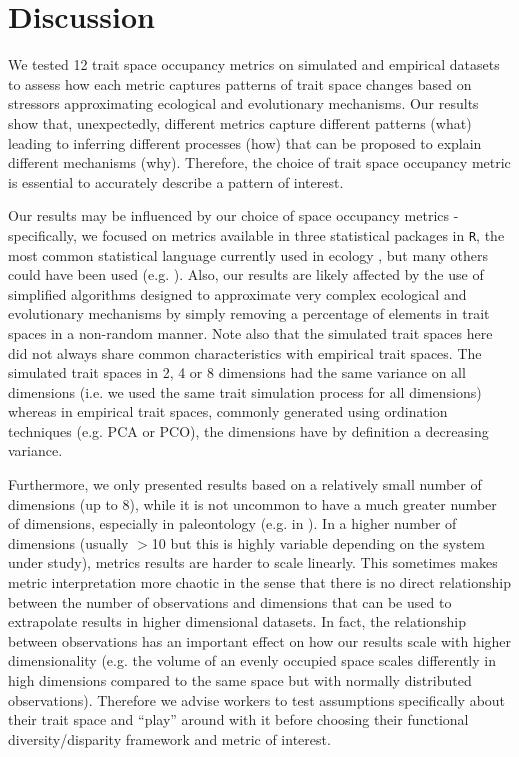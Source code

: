 \documentclass[12pt,letterpaper]{article}
\begin{document}
\section{Discussion}

We tested 12 trait space occupancy metrics on simulated and empirical datasets to assess how each metric captures patterns of trait space changes based on stressors approximating ecological and evolutionary mechanisms.
Our results show that, unexpectedly, different metrics capture different patterns (what) leading to inferring different processes (how) that can be proposed to explain different mechanisms (why).
Therefore, the choice of trait space occupancy metric is essential to accurately describe a pattern of interest.

Our results may be influenced by our choice of space occupancy metrics - specifically, we focused on metrics available in three statistical packages in \texttt{R}, the most common statistical language currently used in ecology \citep{lai2019evaluating}, but many others could have been used (e.g. \citealt{guillerme2020shifting}).
Also, our results are likely affected by the use of simplified algorithms designed to approximate very complex ecological and evolutionary mechanisms by simply removing a percentage of elements in trait spaces in a non-random manner.
Note also that the simulated trait spaces here did not always share common characteristics with empirical trait spaces.
The simulated trait spaces in 2, 4 or 8 dimensions had the same variance on all dimensions (i.e. we used the same trait simulation process for all dimensions) whereas in empirical trait spaces, commonly generated using ordination techniques (e.g. PCA or PCO), the dimensions have by definition a decreasing variance.

Furthermore, we only presented results based on a relatively small number of dimensions (up to 8), while it is not uncommon to have a much greater number of dimensions, especially in paleontology (e.g. in \citealt{van2023should}).
In a higher number of dimensions (usually $>$10 but this is highly variable depending on the system under study), metrics results are harder to scale linearly.
This sometimes makes metric interpretation more chaotic \cite{bellman1957dynamic} in the sense that there is no direct relationship between the number of observations and dimensions that can be used to extrapolate results in higher dimensional datasets.
In fact, the relationship between observations has an important effect on how our results scale with higher dimensionality (e.g. the volume of an evenly occupied space scales differently in high dimensions compared to the same space but with normally distributed observations).
Therefore we advise workers to test assumptions specifically about their trait space and ``play'' around with it before choosing their functional diversity/disparity framework and metric of interest.
\end{document}
